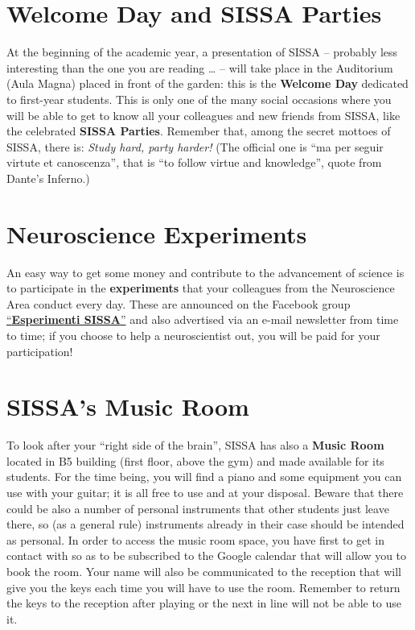 \documentclass{sissavademecum}
\begin{document}
\section{Welcome Day and SISSA Parties}

At the beginning of the academic year, a presentation of SISSA -- probably less interesting than the one you are reading {\dots} -- will take place in the Auditorium (Aula Magna) placed in front of the garden: this is the \textbf{Welcome Day} dedicated to first-year students. This is only one of the many social occasions where you will be able to get to know all your colleagues and new friends from SISSA, like the celebrated \textbf{SISSA Parties}. Remember that, among the secret mottoes of SISSA, there is: \textit{Study hard, party harder!} (The official one is ``ma per seguir virtute et canoscenza'', that is ``to follow virtue and knowledge'', quote from Dante's Inferno.) 


\section{Neuroscience Experiments}

An easy way to get some money and contribute to the advancement of science is to participate in the \textbf{experiments} that your colleagues from the Neuroscience Area conduct every day. These are announced on the Facebook group \href{https://www.facebook.com/groups/144096472323480}{``\textbf{Esperimenti SISSA}''} and also advertised via an e-mail newsletter from time to time; if you choose to help a neuroscientist out, you will be paid for your participation!


\section{SISSA's Music Room}

To look after your ``right side of the brain'', SISSA has also a \textbf{Music Room} located in B5 building (first floor, above the gym) and made available for its students. For the time being, you will find a piano and some equipment you can use with your guitar; it is all free to use and at your disposal. Beware that there could be also a number of personal instruments that other students just leave there, so (as a general rule) instruments already in their case should be intended as personal. In order to access the music room space, you have first to get in contact with  so as to be subscribed to the Google calendar that will allow you to book the room. Your name will also be communicated to the reception that will give you the keys each time you will have to use the room. Remember to return the keys to the reception after playing or the next in line will not be able to use it.
\end{document}
